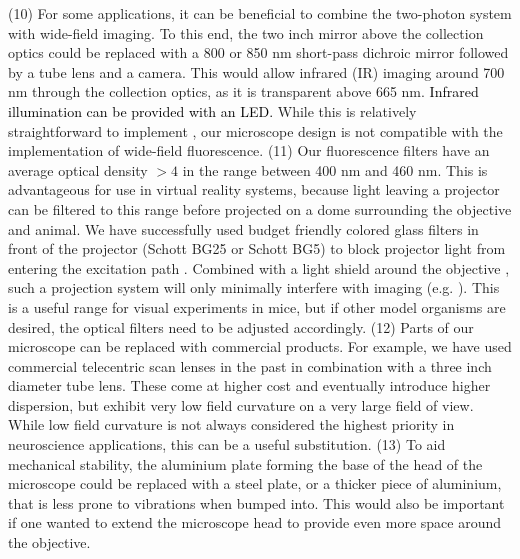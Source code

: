 \documentclass[10pt,letterpaper]{article}
\begin{document}
(10) For some applications, it can be beneficial to combine the two-photon system with wide-field imaging. To this end, the two inch mirror above the collection optics could be replaced with a 800 or 850 nm short-pass dichroic mirror followed by a tube lens and a camera. This would allow infrared (IR) imaging around 700 nm through the collection optics, as it is transparent above 665 nm. \textcolor{black}{Infrared illumination can be provided with an LED.} While this is relatively straightforward to implement \cite{Rosenegger2014}, our microscope design is not compatible with the implementation of wide-field fluorescence.\newline
(11) Our fluorescence filters have an average optical density $>4$ in the range between 400 nm and 460 nm. This is advantageous for use in virtual reality systems, because light leaving a projector can be filtered to this range before projected on a dome surrounding the objective and animal. We have successfully used budget friendly colored glass filters in front of the projector (Schott BG25 or Schott BG5) to block projector light from entering the excitation path \cite{Dombeck2007}. Combined with a light shield around the objective \cite{Dombeck2010}, such a projection system will only minimally interfere with imaging (e.g. \cite{Nieh2021}). This is a useful range for visual experiments in mice, but if other model organisms are desired, the optical filters need to be adjusted accordingly.\newline
(12) Parts of our microscope can be replaced with commercial products. For example, we have used commercial telecentric scan lenses in the past \cite{Song2017, Rich2024} in combination with a three inch diameter tube lens. These come at higher cost and eventually introduce higher dispersion, but exhibit very low field curvature on a very large field of view. While low field curvature is not always considered the highest priority in neuroscience applications, this can be a useful substitution.\newline
(13) To aid mechanical stability, the aluminium plate forming the base of the head of the microscope could be replaced with a steel plate, or a thicker piece of aluminium, that is less prone to vibrations when bumped into. This would also be important if one wanted to extend the microscope head to provide even more space around the objective.
\end{document}
